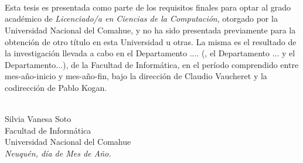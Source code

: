 \ \\
\ \\
\label{pagpref}
\\
\ \\
\ \\

\ \\

\ \\
\ \\


Esta tesis es presentada como parte de los requisitos finales para optar al grado acad\'emico de {\em Licenciado/a en Ciencias de la Computación}, otorgado por la Universidad Nacional del Comahue, y no ha sido presentada previamente para la obtención de otro título en esta Universidad u otras. La misma es el resultado de la investigación llevada a cabo en el Departamento .... (, el Departamento ... y el Departamento...), de la Facultad de Informática, en el período comprendido entre mes-año-inicio y mes-año-fin, bajo la dirección de Claudio Vaucheret y la codirección de Pablo Kogan.




\vspace{3cm}


\ \\
{\flushright Silvia Vanesa Soto\\
{\sc Facultad de Informática \\
Universidad Nacional del Comahue}\\
{\em Neuqu\'en, d\'ia de Mes de A\~no.}\\}

\vfill

